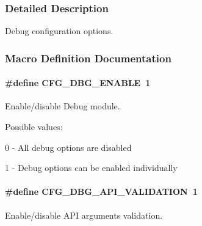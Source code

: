 \subsubsection{Detailed Description}
Debug configuration options. 

\subsubsection{Macro Definition Documentation}
\hypertarget{group__dbg__cfg_ga2ee37a5fa7efdba7d0014328e6c623a8}{
\paragraph[{C\-F\-G\-\_\-\-D\-B\-G\-\_\-\-E\-N\-A\-B\-L\-E}]{\setlength{\rightskip}{0pt plus 5cm}\#define C\-F\-G\-\_\-\-D\-B\-G\-\_\-\-E\-N\-A\-B\-L\-E~1}}\label{group__dbg__cfg_ga2ee37a5fa7efdba7d0014328e6c623a8}


Enable/disable Debug module. 

Possible values\-:
\begin{DoxyItemize}
\item 0 -\/ All debug options are disabled
\item 1 -\/ Debug options can be enabled individually 
\end{DoxyItemize}\hypertarget{group__dbg__cfg_ga64e39c477ef9d900b82585150329e3f0}{
\paragraph[{C\-F\-G\-\_\-\-D\-B\-G\-\_\-\-A\-P\-I\-\_\-\-V\-A\-L\-I\-D\-A\-T\-I\-O\-N}]{\setlength{\rightskip}{0pt plus 5cm}\#define C\-F\-G\-\_\-\-D\-B\-G\-\_\-\-A\-P\-I\-\_\-\-V\-A\-L\-I\-D\-A\-T\-I\-O\-N~1}}\label{group__dbg__cfg_ga64e39c477ef9d900b82585150329e3f0}


Enable/disable A\-P\-I arguments validation. 

